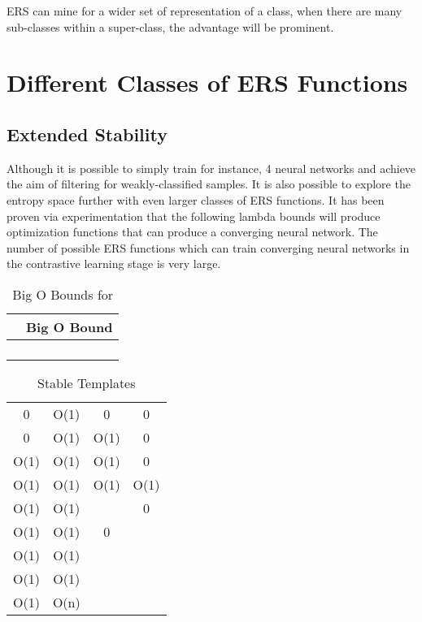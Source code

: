 \documentclass[10pt,twocolumn,letterpaper]{article}
\begin{document}
ERS can mine for a wider set of representation of a class, when there are many sub-classes within a super-class, the advantage will be prominent.

\section{Different Classes of ERS Functions}


\subsection{Extended Stability}
Although it is possible to simply train for instance, 4 neural networks and achieve the aim of filtering for weakly-classified samples. It is also possible to explore the entropy space further with even larger classes of ERS functions. It has been proven via experimentation that the following lambda bounds will produce optimization functions that can produce a converging neural network. The number of possible ERS functions which can train converging neural networks in the contrastive learning stage is very large. 

\begin{table}[h]
\centering
\caption{Big O Bounds for }
\label{tab:tabel3}
\begin{tabular}{|c|c|}
\hline
 & Big O Bound  \\ \hline
 &  \\
 &  \\
 &  \\
 &  \\
\hline
\end{tabular}
\end{table}

\begin{table}[h]
\centering
\caption{Stable Templates}
\label{tab:tabela1}
\begin{tabular}{|c|c|c|c|}
\hline
 &  &  &   \\ \hline
0 & O(1) & 0 & 0 \\
0 & O(1) & O(1) & 0 \\
O(1) & O(1) & O(1) & 0 \\
O(1) & O(1) & O(1) & O(1) \\
O(1) & O(1) &  & 0 \\
O(1) & O(1) & 0 &  \\
O(1) & O(1) &  &  \\
O(1) & O(1) &  &   \\
O(1) & O(n) &  &  \\
\hline
\end{tabular}
\end{table}
\end{document}
